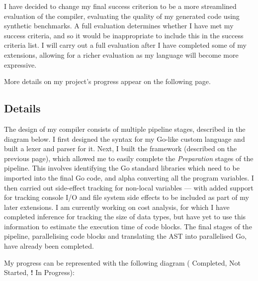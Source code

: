 \documentclass[12pt,a4paper,twoside,openright]{report}
\begin{document}
I have decided to change my final success criterion to be a more streamlined evaluation of the compiler, evaluating the quality of my generated code using synthetic benchmarks. A full evaluation determines whether I have met my success criteria, and so it would be inappropriate to include this in the success criteria list. I will carry out a full evaluation after I have completed some of my extensions, allowing for a richer evaluation as my language will become more expressive.

More details on my project's progress appear on the following page.

\newpage

\subsection*{Details}

The design of my compiler consists of multiple pipeline stages, described in the diagram below. I first designed the syntax for my Go-like custom language and built a lexer and parser for it. Next, I built the framework (described on the previous page), which allowed me to easily complete the \textit{Preparation} stages of the pipeline. This involves identifying the Go standard libraries which need to be imported into the final Go code, and alpha converting all the program variables. I then carried out side-effect tracking for non-local variables  — with added support for tracking console I/O and file system side effects to be included as part of my later extensions. I am currently working on cost analysis, for which I have completed inference for tracking the size of data types, but have yet to use this information to estimate the execution time of code blocks. The final stages of the pipeline, parallelising code blocks and translating the AST into parallelised Go, have already been completed.

\newcommand{\cmark}{\ding{51}}%
\newcommand{\xmark}{\ding{55}}%

My progress can be represented with the following diagram (\cmark{} Completed, \xmark{} Not Started, \textbf{!} In Progress):

\vspace{3mm}

\end{document}
